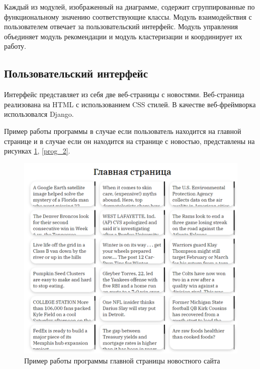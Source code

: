 Каждый из модулей, изображенный на диаграмме, содержит сгруппированные по функциональному значению соответствующие классы. Модуль взаимодействия с пользователем отвечает за пользовательский интерфейс. Модуль управления объединяет модуль рекомендации и модуль кластеризации и координирует их работу.

\subsection{Пользовательский интерфейс}

Интерфейс представляет из себя две веб-страницы с новостями. Веб-страница реализована на HTML с использованием CSS стилей. В качестве веб-фреймворка использовался Django.

Пример работы программы в случае если пользователь находится на главной странице и в случае если он находится на странице с новостью, представлены на рисунках \ref{prog_1}, \ref{prog_2}.

\begin{figure}[H]
	\centering
	\includegraphics[width=\textwidth]{img/prog_1.pdf}
	\caption{Пример работы программы главной страницы новостного сайта}
	\label{prog_1}
\end{figure}  

